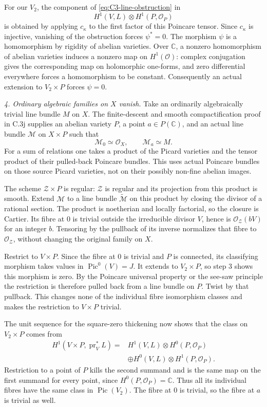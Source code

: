 For our $V_2$, the component of
\eqref{eq:C3-line-obstruction} in
\[
                H^1(V,L)\otimes H^1(P,\mathcal O_P)
\]
is obtained by applying $c_\kappa$ to the first
factor of this Poincare tensor. Since
$c_\kappa$ is injective, vanishing of the
obstruction forces $\psi^*=0$. The morphism
$\psi$ is a homomorphism by rigidity of abelian
varieties. Over $\mathbb C$, a nonzero
homomorphism of abelian varieties induces a
nonzero map on $H^1(\mathcal O)$: complex
conjugation gives the corresponding map on
holomorphic one-forms, and zero differential
everywhere forces a homomorphism to be constant.
Consequently an actual extension to
$V_2\times P$ forces $\psi=0$.

\emph{4. Ordinary algebraic families on $X$ vanish.}
Take an ordinarily algebraically trivial line
bundle $M$ on $X$. The finite-descent and smooth
compactification proof in C.3j supplies an
abelian variety $P$, a point $a\in P(\mathbb C)$,
and an actual line bundle $\mathcal M$ on
$X\times P$ such that
\[
                    \mathcal M_0\simeq\mathcal O_X,
                    \qquad \mathcal M_a\simeq M.
\]
For a sum of relations one takes a product of
the Picard varieties and the tensor product
of their pulled-back Poincare bundles. This
uses actual Poincare bundles on those source
Picard varieties, not on their possibly
non-fine abelian images.

The scheme $\mathcal Z\times P$ is regular:
$\mathcal Z$ is regular and its projection
from this product is smooth. Extend
$\mathcal M$ to a line bundle
$\widetilde{\mathcal M}$ on this product by
closing the divisor of a rational section.
The product is noetherian and locally factorial,
so the closure is Cartier. Its fibre at $0$
is trivial outside the irreducible divisor
$V$, hence is $\mathcal O_{\mathcal Z}(bV)$
for an integer $b$. Tensoring by the pullback
of its inverse normalizes that fibre to
$\mathcal O_{\mathcal Z}$, without changing
the original family on $X$.

Restrict to $V\times P$. Since the fibre at
$0$ is trivial and $P$ is connected, its
classifying morphism takes values in
$\operatorname{Pic}^0(V)=J$. It extends to
$V_2\times P$, so step 3 shows this morphism
is zero. By the Poincare universal property
or the see-saw principle the restriction is
therefore pulled back from a line bundle on
$P$. Twist by that pullback. This changes
none of the individual fibre isomorphism
classes and makes the restriction to
$V\times P$ trivial.

The unit sequence for the square-zero
thickening now shows that the class on
$V_2\times P$ comes from
\[
\begin{aligned}
 H^1(V\times P,\operatorname{pr}_V^*L)
  ={}&H^1(V,L)\otimes H^0(P,\mathcal O_P)\\
    &\oplus H^0(V,L)\otimes H^1(P,\mathcal O_P).
\end{aligned}
\]
Restriction to a point of $P$ kills the second
summand and is the same map on the first
summand for every point, since
$H^0(P,\mathcal O_P)=\mathbb C$. Thus all
its individual fibres have the same class
in $\operatorname{Pic}(V_2)$. The fibre at
$0$ is trivial, so the fibre at $a$ is
trivial as well.

